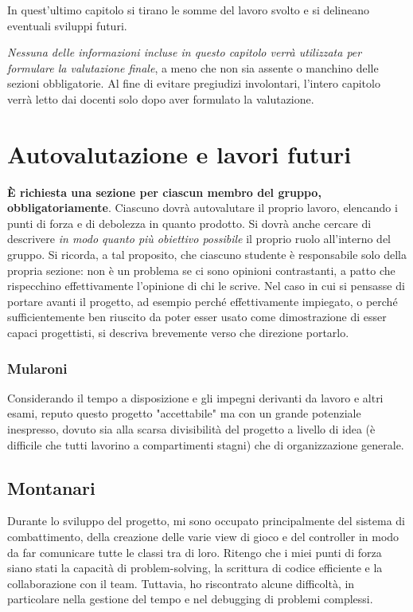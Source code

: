 \documentclass[a4paper,12pt]{report}
\begin{document}
In quest'ultimo capitolo si tirano le somme del lavoro svolto e si delineano eventuali sviluppi
futuri.

\textit{Nessuna delle informazioni incluse in questo capitolo verrà utilizzata per formulare la valutazione finale}, a meno che non sia assente o manchino delle sezioni obbligatorie.
%
Al fine di evitare pregiudizi involontari, l'intero capitolo verrà letto dai docenti solo dopo aver formulato la valutazione.

\section{Autovalutazione e lavori futuri}

\textbf{È richiesta una sezione per ciascun membro del gruppo, obbligatoriamente}.
%
Ciascuno dovrà autovalutare il proprio lavoro, elencando i punti di forza e di debolezza in quanto prodotto.
Si dovrà anche cercare di descrivere \emph{in modo quanto più obiettivo possibile} il proprio ruolo all'interno del gruppo.
Si ricorda, a tal proposito, che ciascuno studente è responsabile solo della propria sezione: non è un problema se ci sono opinioni contrastanti, a patto che rispecchino effettivamente l'opinione di chi le scrive.
Nel caso in cui si pensasse di portare avanti il progetto, ad esempio perché effettivamente impiegato, o perché sufficientemente ben riuscito da poter esser usato come dimostrazione di esser capaci progettisti, si descriva brevemente verso che direzione portarlo.

\subsubsection{Mularoni}
Considerando il tempo a disposizione e gli impegni derivanti da lavoro e altri esami, reputo questo progetto "accettabile" ma con un grande potenziale inespresso,
%
dovuto sia alla scarsa divisibilità del progetto a livello di idea (è difficile che tutti lavorino a compartimenti stagni) che di organizzazione generale.
\subsection{Montanari}
Durante lo sviluppo del progetto, mi sono occupato principalmente del sistema di combattimento, della creazione delle varie view di gioco e del controller in modo da far comunicare tutte le classi tra di loro. Ritengo che i miei punti di forza siano stati la capacità di problem-solving, la scrittura di codice efficiente e la collaborazione con il team. Tuttavia, ho riscontrato alcune difficoltà, in particolare nella gestione del tempo e nel debugging di problemi complessi.
\end{document}
